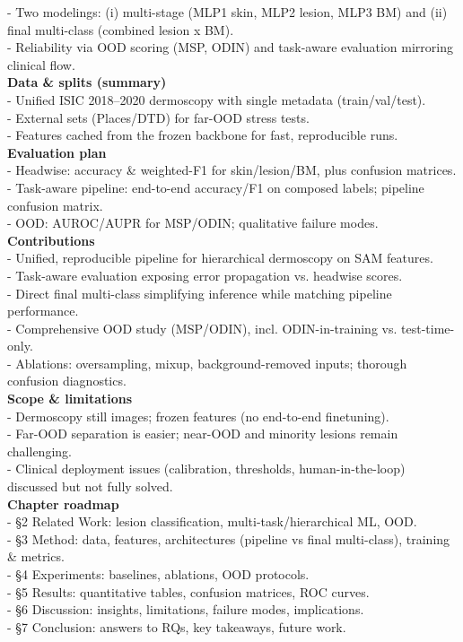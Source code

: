 {- Two modelings: (i) multi-stage (MLP1 skin, MLP2 lesion, MLP3 BM) and (ii) final multi-class (combined lesion x BM).\\
- Reliability via OOD scoring (MSP, ODIN) and task-aware evaluation mirroring clinical flow.\\
\textbf{Data \& splits (summary)}\\
- Unified ISIC 2018--2020 dermoscopy with single metadata (train/val/test).\\
- External sets (Places/DTD) for far-OOD stress tests.\\
- Features cached from the frozen backbone for fast, reproducible runs.\\
\textbf{Evaluation plan}\\
- Headwise: accuracy \& weighted-F1 for skin/lesion/BM, plus confusion matrices.\\
- Task-aware pipeline: end-to-end accuracy/F1 on composed labels; pipeline confusion matrix.\\
- OOD: AUROC/AUPR for MSP/ODIN; qualitative failure modes.\\
\textbf{Contributions}\\
- Unified, reproducible pipeline for hierarchical dermoscopy on SAM features.\\
- Task-aware evaluation exposing error propagation vs. headwise scores.\\
- Direct final multi-class simplifying inference while matching pipeline performance.\\
- Comprehensive OOD study (MSP/ODIN), incl. ODIN-in-training vs. test-time-only.\\
- Ablations: oversampling, mixup, background-removed inputs; thorough confusion diagnostics.\\
\textbf{Scope \& limitations}\\
- Dermoscopy still images; frozen features (no end-to-end finetuning).\\
- Far-OOD separation is easier; near-OOD and minority lesions remain challenging.\\
- Clinical deployment issues (calibration, thresholds, human-in-the-loop) discussed but not fully solved.\\
\textbf{Chapter roadmap}\\
- \S2 Related Work: lesion classification, multi-task/hierarchical ML, OOD.\\
- \S3 Method: data, features, architectures (pipeline vs final multi-class), training \& metrics.\\
- \S4 Experiments: baselines, ablations, OOD protocols.\\
- \S5 Results: quantitative tables, confusion matrices, ROC curves.\\
- \S6 Discussion: insights, limitations, failure modes, implications.\\
- \S7 Conclusion: answers to RQs, key takeaways, future work.}

